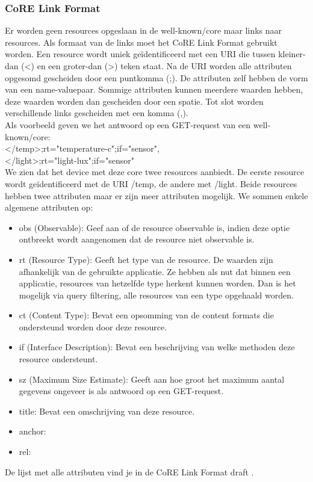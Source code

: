 \subsubsection{CoRE Link Format}
Er worden geen resources opgeslaan in de well-known/core maar links naar resources. Als formaat van de links moet het CoRE Link Format gebruikt worden. Een resource wordt uniek ge\"{i}dentificeerd met een URI die tussen kleiner-dan (\textless) en een groter-dan (\textgreater) teken staat. Na de URI worden alle attributen opgesomd gescheiden door een puntkomma (;). De attributen zelf hebben de vorm van een name-valuepaar. Sommige attributen kunnen meerdere waarden hebben, deze waarden worden dan gescheiden door een spatie. Tot slot worden verschillende links gescheiden met een komma (,).\\

\noindent
Als voorbeeld geven we het antwoord op een GET-request van een well-known/core:\\
\textless/temp\textgreater;rt="temperature-c";if="sensor",\\
\textless/light\textgreater;rt="light-lux";if="sensor"\\
We zien dat het device met deze core twee resources aanbiedt. De eerste resource wordt ge\"{i}dentificeerd met de URI /temp, de andere met /light. Beide resources hebben twee attributen maar er zijn meer attributen mogelijk. We sommen enkele algemene attributen op:
\begin{itemize}
\item obs (Observable): Geef aan of de resource observable is, indien deze optie ontbreekt wordt aangenomen dat de resource niet observable is.
\item rt (Resource Type): Geeft het type van de resource. De waarden zijn afhankelijk van de gebruikte applicatie. Ze hebben als nut dat binnen een applicatie, resources van hetzelfde type herkent kunnen worden. Dan is het mogelijk via query filtering, alle resources van een type opgehaald worden.
\item ct (Content Type): Bevat een opsomming van de content formats die ondersteund worden door deze resource. 
\item if (Interface Description): Bevat een beschrijving van welke methoden deze resource ondersteunt.
\item sz (Maximum Size Estimate): Geeft aan hoe groot het maximum aantal gegevens ongeveer is als antwoord op een GET-request.
\item title: Bevat een omschrijving van deze resource.
\item anchor: 
\item rel: 
\end{itemize}
De lijst met alle attributen vind je in de CoRE Link Format draft \cite{coapDiscovery}.


